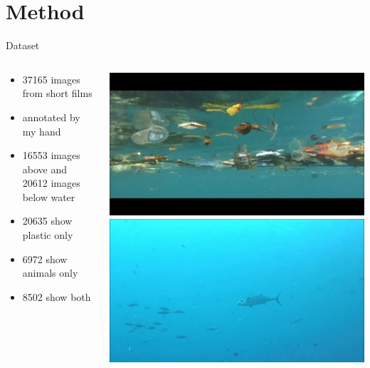 \documentclass{beamer}
\begin{document}
\section{Method}
    \begin{frame}{Dataset}
        \begin{columns}[c]
            \begin{column}{.5\textwidth}
                \begin{itemize}
                \item 37165 images from short films
                \item annotated by my hand
                \item 16553 images above and 20612 images below water
                \item 20635 show plastic only
                \item 6972 show animals only
                \item 8502 show both
                \end{itemize}
            \end{column}
            \begin{column}{.4\textwidth}
                \includegraphics[width=\textwidth]{images/10947_01.jpg}\\
                \includegraphics[width=\textwidth]{images/19358_10.jpg}\\

\end{column}
\end{columns}
\end{frame}
\end{document}
